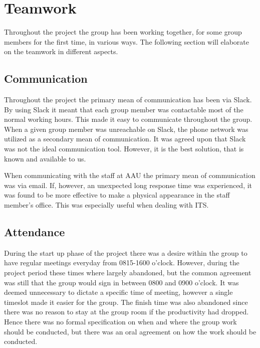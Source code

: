 \section{Teamwork}
Throughout the project the group has been working together, for some group members for the first time, in various ways. 
The following section will elaborate on the teamwork in different aspects. 

\subsection{Communication}
Throughout the project the primary mean of communication has been via Slack. 
By using Slack it meant that each group member was contactable most of the normal working hours.
This made it easy to communicate throughout the group. 
When a given group member was unreachable on Slack, the phone network was utilized as a secondary mean of communication.
It was agreed upon that Slack was not the ideal communication tool. 
However, it is the best solution, that is known and available to us.

When communicating with the staff at AAU the primary mean of communication was via email.
If, however, an unexpected long response time was experienced, it was found to be more effective to make a physical appearance in the staff member's office.
This was especially useful when dealing with ITS.

\subsection{Attendance}
During the start up phase of the project there was a desire within the group to have regular meetings everyday from 0815-1600 o'clock.
However, during the project period these times where largely abandoned, but the common agreement was still that the group would sign in between 0800 and 0900 o'clock.
It was deemed unnecessary to dictate a specific time of meeting, however a single timeslot made it easier for the group. 
The finish time was also abandoned since there was no reason to stay at the group room if the productivity had dropped.
Hence there was no formal specification on when and where the group work should be conducted, but there was an oral agreement on how the work should be conducted.
